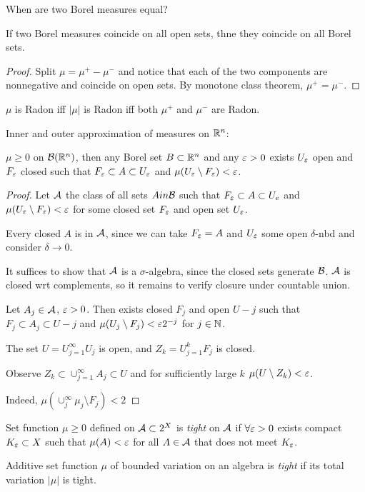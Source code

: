 When are two Borel measures equal?
\begin{lemma}
  If two Borel measures coincide on all open sets, thne they
  coincide on all Borel sets.
\end{lemma}

\begin{proof}
  Split $\mu = \mu^+ - \mu^-$ and notice that each of the two
  components are nonnegative and coincide on open sets.
  By monotone class theorem, $\mu^+ = \mu^-$. 
\end{proof}

$\mu$ is Radon iff $\lvert \mu \rvert$ is Radon iff both $\mu^+$
and $\mu^-$ are Radon.

Inner and outer approximation of measures on $\mathbb{R}^n$:

\begin{theorem}
  $\mu \geq 0$ on $\mathcal{B}(\mathbb{R}^n)$, then any Borel set $B \subset \mathbb{R}^n$ and
  any $\varepsilon > 0$ exists $U_\varepsilon$ open and $F_\varepsilon$ closed such that
  $F_\varepsilon \subset A \subset U_\varepsilon$ and $\mu(U_\varepsilon \setminus F_\varepsilon) < \varepsilon$.
\end{theorem}

\begin{proof}
  Let $\mathcal{A}$ the class of all sets $A in \mathcal{B}$ such that
  $F_\varepsilon \subset A \subset U_e$ and $\mu(U_\varepsilon \setminus F_\varepsilon) < \varepsilon$
  for some closed set $F_\varepsilon$ and open set $U_\varepsilon$.

  Every closed $A$ is in $\mathcal{A}$, since we can take
  $F_\varepsilon = A$ and $U_\varepsilon$ some open $\delta$-nbd
  and consider $\delta \to 0$.

  It suffices to show that $\mathcal{A}$ is a $\sigma$-algebra, since the closed
  sets generate $\mathcal{B}$. $\mathcal{A}$ is closed wrt complements, so it remains
  to verify closure under countable union.

  Let $A_j \in \mathcal{A}$, $\varepsilon > 0$. Then exists closed $F_j$
  and open $U-j$ such that $F_j \subset A_j \subset U-j$ and
  $\mu(U_j \setminus F_j) < \varepsilon 2^{-j}$ for $j \in \mathbb{N}$.

  The set $U = U_{j=1}^\infty U_j$ is open, and $Z_k = U_{j=1}^k F_j$ is closed.

  Observe $Z_k \subset \cup_{j=1}^\infty A_j \subset U$ and for
  sufficiently large $k$ $\mu(U \setminus Z_k) < \varepsilon$.

  Indeed, $\mu(\cup_j^\infty \mu_j \setminus F_j) < 2^{}$ 
\end{proof}

\begin{definition}
  Set function $\mu \geq 0$ defined on $\mathcal{A} \subset 2^X$
  is \emph{tight} on $\mathcal{A}$ if $\forall \varepsilon > 0$ exists compact
  $K_\varepsilon \subset X$ such that $\mu(A) < \varepsilon$ for all $A \in \mathcal{A}$
  that does not meet $K_\varepsilon$.

  Additive set function $\mu$ of bounded variation on an algebra is
  \emph{tight} if its total variation $\lvert \mu \rvert$ is tight.
\end{definition}

